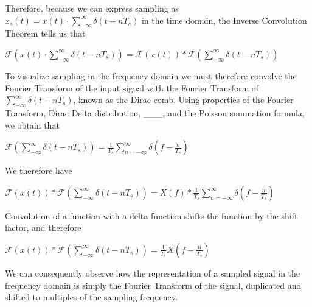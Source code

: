 \documentclass{article}
\begin{document}
Therefore, because we can express sampling as $x_s(t) = x(t) \cdot \sum_{-\infty}^{\infty} \delta (t-nT_s)$ in the time domain, the Inverse Convolution Theorem tells us that %
\begin{center}
    \begin{math}
        \mathcal{F}\left(x(t) \cdot \sum_{-\infty}^{\infty} \delta (t-nT_s)\right) = \mathcal{F}(x(t)) * \mathcal{F}\left( \sum_{-\infty}^{\infty} \delta (t-nT_s) \right)
    \end{math}  
\end{center}

To visualize sampling in the frequency domain we must therefore convolve the Fourier Transform of the input signal with the Fourier Transform of $\sum_{-\infty}^{\infty} \delta (t-nT_s)$, known as the Dirac comb. %
Using properties of the Fourier Transform, Dirac Delta distribution, \_\_\_, %
and the Poisson summation formula, 
we obtain that 
\begin{center}
    \begin{math}
        \mathcal{F}\left(\sum_{-\infty}^{\infty} \delta (t-nT_s)\right) = \frac{1}{T_s} \sum_{n = -\infty}^{\infty} \delta \left( f - \frac{n}{T_s} \right)
    \end{math}  
\end{center}
We therefore have
\begin{center}
    \begin{math}
        \mathcal{F}(x(t)) * \mathcal{F}\left( \sum_{-\infty}^{\infty} \delta (t-nT_s) \right) = X(f) * \frac{1}{T_s} \sum_{n = -\infty}^{\infty} \delta \left( f - \frac{n}{T_s} \right)
    \end{math}  
\end{center}
Convolution of a function with a delta function shifts the function by the shift factor, and therefore %
\begin{center}
    \begin{math}
        \mathcal{F}(x(t)) * \mathcal{F}\left( \sum_{-\infty}^{\infty} \delta (t-nT_s) \right) = \frac{1}{T_s} X\left(f - \frac{n}{T_s} \right)
    \end{math}  
\end{center}
We can consequently observe how the representation of a sampled signal in the frequency domain is simply the Fourier Transform of the signal, duplicated and shifted to multiples of the sampling frequency. %
\end{document}

